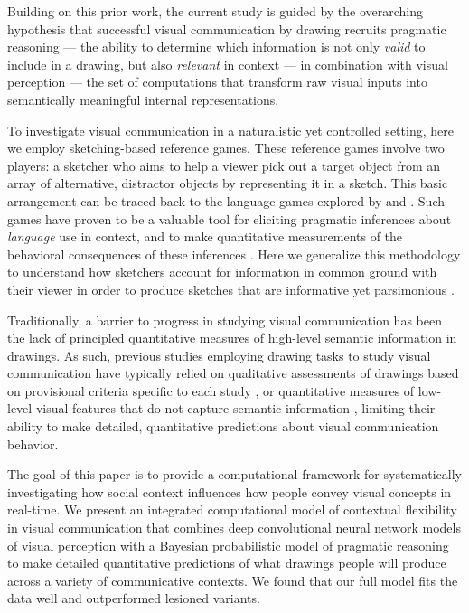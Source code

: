 \documentclass[9pt,twocolumn,twoside]{pnas-new}
\begin{document}
Building on this prior work, the current study is guided by the overarching hypothesis that successful visual communication by drawing recruits pragmatic reasoning \cite{goodman2016pragmatic,clark1996using,wilson1986relevance,grice1975syntax} --- the ability to determine which information is not only \textit{valid} to include in a drawing, but also \textit{relevant} in context --- in combination with visual perception --- the set of computations that transform raw visual inputs into semantically meaningful internal representations.

To investigate visual communication in a naturalistic yet controlled setting, here we employ sketching-based reference games. 
These reference games involve two players: a sketcher who aims to help a viewer pick out a target object from an array of alternative, distractor objects by representing it in a sketch. 
This basic arrangement can be traced back to the language games explored by \citep{wittgenstein1953philosophical} and \citep{Lewis69_Convention}. 
Such games have proven to be a valuable tool for eliciting pragmatic inferences about \textit{language} use in context, and to make quantitative measurements of the behavioral consequences of these inferences \cite{goodman2016pragmatic,kao2014formalizing,goodman2013knowledge,frank2012predicting}. 
Here we generalize this methodology to understand how sketchers account for information in common ground with their viewer in order to produce sketches that are informative \cite{grice1975syntax,wilson1986relevance} yet parsimonious \cite{zipf1936psycho}.

Traditionally, a barrier to progress in studying visual communication has been the lack of principled quantitative measures of high-level semantic information in drawings. 
As such, previous studies employing drawing tasks to study visual communication have typically relied on qualitative assessments of drawings based on provisional criteria specific to each study \cite{Healey:2007vq}, or quantitative measures of low-level visual features that do not capture semantic information \cite{Garrod:2007wk}, limiting their ability to make detailed, quantitative predictions about visual communication behavior.

The goal of this paper is to provide a computational framework for systematically investigating how social context influences how people convey visual concepts in real-time. 
We present an integrated computational model of contextual flexibility in visual communication that combines deep convolutional neural network models of visual perception with a Bayesian probabilistic model of pragmatic reasoning \cite{goodman2016pragmatic} to make detailed quantitative predictions of what drawings people will produce across a variety of communicative contexts. 
We found that our full model fits the data well and outperformed lesioned variants.
\end{document}
